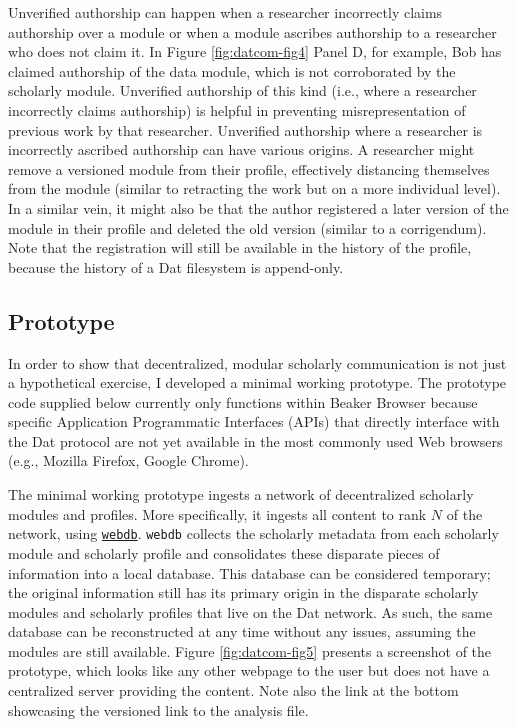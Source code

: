 \documentclass[a5paper]{book}
\begin{document}
Unverified authorship can happen when a researcher incorrectly claims
authorship over a module or when a module ascribes authorship to a
researcher who does not claim it. In Figure \ref{fig:datcom-fig4} Panel
D, for example, Bob has claimed authorship of the data module, which is
not corroborated by the scholarly module. Unverified authorship of this
kind (i.e., where a researcher incorrectly claims authorship) is helpful
in preventing misrepresentation of previous work by that researcher.
Unverified authorship where a researcher is incorrectly ascribed
authorship can have various origins. A researcher might remove a
versioned module from their profile, effectively distancing themselves
from the module (similar to retracting the work but on a more individual
level). In a similar vein, it might also be that the author registered a
later version of the module in their profile and deleted the old version
(similar to a corrigendum). Note that the registration will still be
available in the history of the profile, because the history of a Dat
filesystem is append-only.

\subsection{Prototype}\label{prototype}

In order to show that decentralized, modular scholarly communication is
not just a hypothetical exercise, I developed a minimal working
prototype. The prototype code supplied below currently only functions
within Beaker Browser because specific Application Programmatic
Interfaces (APIs) that directly interface with the Dat protocol are not
yet available in the most commonly used Web browsers (e.g., Mozilla
Firefox, Google Chrome).

The minimal working prototype ingests a network of decentralized
scholarly modules and profiles. More specifically, it ingests all
content to rank \(N\) of the network, using
\href{https://github.com/beakerbrowser/webdb}{\texttt{webdb}}.
\texttt{webdb} collects the scholarly metadata from each scholarly
module and scholarly profile and consolidates these disparate pieces of
information into a local database. This database can be considered
temporary; the original information still has its primary origin in the
disparate scholarly modules and scholarly profiles that live on the Dat
network. As such, the same database can be reconstructed at any time
without any issues, assuming the modules are still available. Figure
\ref{fig:datcom-fig5} presents a screenshot of the prototype, which
looks like any other webpage to the user but does not have a centralized
server providing the content. Note also the link at the bottom
showcasing the versioned link to the analysis file.
\end{document}
